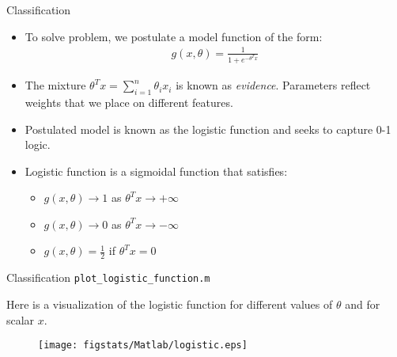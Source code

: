 \documentclass[handout,9pt]{beamer}
\begin{document}
\begin{frame}{Classification}


\begin{itemize}
  \setlength{\itemsep}{10pt}
\item To solve problem, we postulate a model function of the form:
\begin{align*}
g(x,\theta)=\frac{1}{1+e^{-\theta^Tx}}
\end{align*}
 
\item The mixture $\theta^Tx=\sum_{i=1}^n\theta_ix_i$ is known as {\em evidence}. Parameters reflect weights that we place on different features.

\item Postulated model is known as the logistic function and seeks to capture 0-1 logic. 
\item Logistic function is a sigmoidal function that satisfies:

\begin{itemize}
  \setlength{\itemsep}{10pt}
 \item $g(x,\theta)\to 1$ as $\theta^Tx\to +\infty$ 
 \item $g(x,\theta)\to 0$ as $\theta^Tx\to -\infty$ 
 \item $g(x,\theta)=\frac{1}{2}$ if $\theta^Tx=0$
\end{itemize}

\end{itemize}

\end{frame}

%
\begin{frame}{Classification \footnotesize{\texttt{plot\_logistic\_function.m}}}

Here is a visualization of the logistic function for different values of $\theta$ and for scalar $x$. 
\begin{figure}[!htb]
    \centering
	\texttt{[image: figstats/Matlab/logistic.eps]}
\end{figure}
\end{frame}


\end{document}
